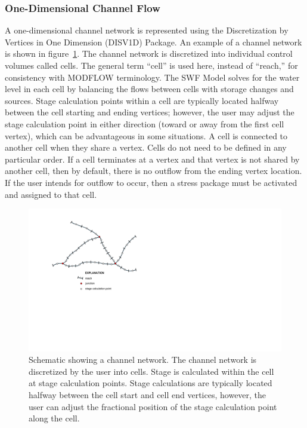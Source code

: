 \documentclass[fleqn]{article}
\begin{document}
\subsubsection{One-Dimensional Channel Flow}
A one-dimensional channel network is represented using the Discretization by Vertices in One Dimension (DISV1D) Package.  An example of a channel network is shown in figure~\ref{fig:channel_network}.  The channel network is discretized into individual control volumes called cells.  The general term ``cell'' is used here, instead of ``reach,'' for consistency with MODFLOW terminology.  The SWF Model solves for the water level in each cell by balancing the flows between cells with storage changes and sources.  Stage calculation points within a cell are typically located halfway between the cell starting and ending vertices; however, the user may adjust the stage calculation point in either direction (toward or away from the first cell vertex), which can be advantageous in some situations.  A cell is connected to another cell when they share a vertex.  Cells do not need to be defined in any particular order.  If a cell terminates at a vertex and that vertex is not shared by another cell, then by default, there is no outflow from the ending vertex location.  If the user intends for outflow to occur, then a stress package must be activated and assigned to that cell.

\begin{figure}
  \centering
  \includegraphics[scale=0.9]{figures/channel_network.pdf}
  \caption[Schematic showing a channel network.]{Schematic showing a channel network.  The channel network is discretized by the user into cells.  Stage is calculated within the cell at stage calculation points.  Stage calculations are typically located halfway between the cell start and cell end vertices, however, the user can adjust the fractional position of the stage calculation point along the cell.}
  \label{fig:channel_network}
\end{figure}
  
\end{document}
